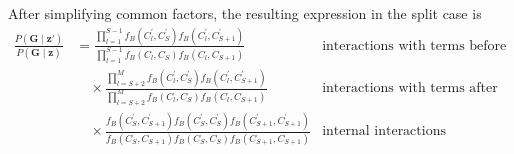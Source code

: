 After simplifying common factors, the resulting expression in the split case is
\begin{align*}
    \frac{P(\bm{G}\mid \bm{z}')}{P(\bm{G}\mid \bm{z})}
    &= \frac{\prod_{l=1}^{S-1} f_B(C_l^\prime, C_S^\prime) f_B(C_l^\prime, C_{S+1}^\prime)}{\prod_{l=1}^{S-1} f_B(C_l, C_S) f_B(C_l, C_{S+1})} & \text{interactions with terms before}\\
    & \quad \times \frac{\prod_{l=S+2}^{M} f_B(C_l^\prime, C_S^\prime) f_B(C_l^\prime, C_{S+1}^\prime)}{\prod_{l=S+2}^{M} f_B(C_l, C_S) f_B(C_l, C_{S+1})} & \text{interactions with terms after}\\
    & \quad \times \frac{f_B(C_S^\prime, C_{S+1}^\prime) f_B(C_S^\prime, C_S^\prime) f_B(C_{S+1}^\prime, C_{S+1}^\prime)}{f_B(C_S, C_{S+1}) f_B(C_S, C_S) f_B(C_{S+1}, C_{S+1})} & \text{internal interactions}
\end{align*}




